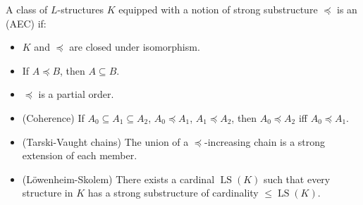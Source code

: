 A class of $L$-structures $K$ equipped with a notion of strong substructure $\preceq$ is an  (AEC) if:
\begin{itemize}
\item $K$ and $\preceq$ are closed under isomorphism.
\item If $A \preceq B$, then $A \subseteq B$.
\item $\preceq$ is a partial order.
\item (Coherence) If $A_0 \subseteq A_1 \subseteq A_2$, $A_0 \preceq A_1$, $A_1 \preceq A_2$, then $A_0 \preceq A_2$ iff $A_0 \preceq A_1$.
\item (Tarski-Vaught chains) The union of a $\preceq$-increasing chain is a strong extension of each member.
\item (L\"owenheim-Skolem) There exists a cardinal $\operatorname{LS}(K)$ such that every structure in $K$ has a strong substructure of cardinality $\leq \operatorname{LS}(K)$.
\end{itemize}
